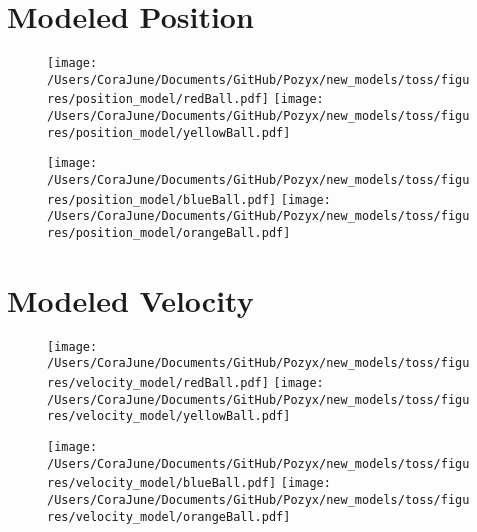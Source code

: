 \documentclass{article}
\begin{document}
\section{Modeled Position}
\begin{figure}[h!]
\begin{multicols}{2}
    \texttt{[image: /Users/CoraJune/Documents/GitHub/Pozyx/new\_models/toss/figures/position\_model/redBall.pdf]}
    \texttt{[image: /Users/CoraJune/Documents/GitHub/Pozyx/new\_models/toss/figures/position\_model/yellowBall.pdf]}
\end{multicols}

\begin{multicols}{2}
    \texttt{[image: /Users/CoraJune/Documents/GitHub/Pozyx/new\_models/toss/figures/position\_model/blueBall.pdf]}
    \texttt{[image: /Users/CoraJune/Documents/GitHub/Pozyx/new\_models/toss/figures/position\_model/orangeBall.pdf]}
\end{multicols}


\end{figure}
\newpage
\section{Modeled Velocity}
\begin{figure}[h!]
\begin{multicols}{2}
    \texttt{[image: /Users/CoraJune/Documents/GitHub/Pozyx/new\_models/toss/figures/velocity\_model/redBall.pdf]}
    \texttt{[image: /Users/CoraJune/Documents/GitHub/Pozyx/new\_models/toss/figures/velocity\_model/yellowBall.pdf]}
\end{multicols}

\begin{multicols}{2}
    \texttt{[image: /Users/CoraJune/Documents/GitHub/Pozyx/new\_models/toss/figures/velocity\_model/blueBall.pdf]}
    \texttt{[image: /Users/CoraJune/Documents/GitHub/Pozyx/new\_models/toss/figures/velocity\_model/orangeBall.pdf]}
\end{multicols}

\end{figure}
\newpage
\end{document}
